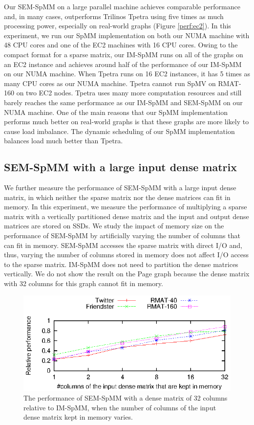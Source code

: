 Our SEM-SpMM on a large parallel machine achieves comparable performance
and, in many cases, outperforms Trilinos Tpetra using five times
as much processing power, especially on
real-world graphs (Figure \ref{perf:ec2}). In this experiment, we run our
SpMM implementation on both our NUMA machine with 48 CPU cores
and one of the EC2 machines with 16 CPU cores. Owing to the compact format
for a sparse matrix, our IM-SpMM runs on all of the graphs on an EC2 instance
and achieves around half of the performance of our IM-SpMM on our NUMA machine.
When Tpetra runs on 16 EC2 instances, it has 5 times as many CPU cores as our
NUMA machine. Tpetra cannot run SpMV on RMAT-160 on two EC2 nodes.
Tpetra uses many more computation resources and still barely reaches
the same performance as our IM-SpMM and SEM-SpMM on our NUMA machine. One of
the main reasons that our SpMM implementation performs much
better on real-world graphs is that these graphs are more likely to cause
load imbalance. The dynamic scheduling of our SpMM implementation balances load much better than Tpetra.

\subsection{SEM-SpMM with a large input dense matrix}

We further measure the performance of SEM-SpMM with a large input dense matrix,
in which neither the sparse matrix nor the dense matrices can fit in memory.
In this experiment, we measure the performance of multiplying a sparse matrix
with a vertically partitioned dense matrix and the input and output dense matrices are
stored on SSDs. We study the impact of memory size on the performance of SEM-SpMM
by artificially varying the number of columns that can fit in memory. SEM-SpMM
accesses the sparse matrix with direct I/O and, thus, varying the number of
columns stored in memory does not affect I/O access to the sparse matrix.
IM-SpMM does not need to partition the dense matrices vertically.
We do not show the result on the Page graph because the dense matrix with
32 columns for this graph cannot fit in memory.

\begin{figure}
	\begin{center}
		\footnotesize
		\includegraphics[scale=1]{SpMM_figs/spmm-32cols.eps}
		\caption{The performance of SEM-SpMM with a dense matrix of 32 columns
			relative to IM-SpMM, when the number of columns of the input dense
		matrix kept in memory varies.}
		\label{perf:spmm32}
	\end{center}
\end{figure}

